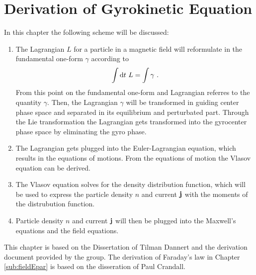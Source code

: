 
\chapter{Derivation of Gyrokinetic Equation}
\label{chap:derivationGyrokineticEq}

\thispagestyle{empty}
\newpage

\bigskip
In this chapter the following scheme will be discussed:
\begin{enumerate}
    \item The Lagrangian $L$ for a particle in a magnetic field will reformulate in the fundamental one-form $\gamma$ according to 
        \begin{gather}
            \int \mathrm{d}t ~ L = \int \gamma~.
        \end{gather}
        From this point on the fundamental one-form and Lagrangian referres to the quantity $\gamma$. Then, the Lagrangian $\gamma$ will be transformed in guiding center phase space and separated in its equilibrium and perturbated part. Through the Lie transformation the Lagrangian gets transformed into the gyrocenter phase space by eliminating the gyro phase. 
    \item The Lagrangian gets plugged into the Euler-Lagrangian equation, which results in the equations of motions. From the equations of motion the Vlasov equation can be derived.
    \item The Vlasov equation solves for the density distribution function, which will be used to express the particle density $n$ and current $\boldsymbol{\mathbf{j}}$ with the moments of the distrubution function. 
    \item Particle density $n$ and current $\boldsymbol{\mathbf{j}}$ will then be plugged into the Maxwell's equations and the field equations.
\end{enumerate}

This chapter is based on the Dissertation of Tilman Dannert\cite{Dannert_PHD} and the derivation document provided by the {\gkw} group\cite{GKWDerivation}. The derivation of Faraday's law in Chapter \ref{sub:fieldEpar} is based on the disseration of Paul Crandall\cite{Crandall_PHD}.

\newpage